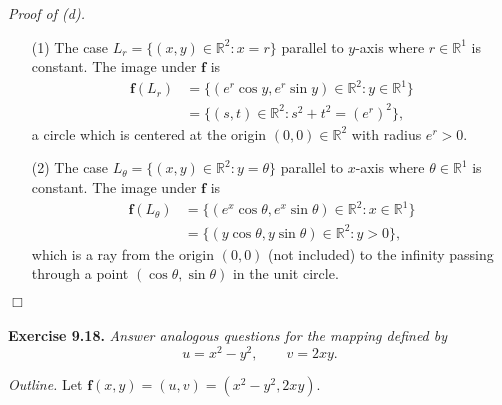 \documentclass{article}
\begin{document}
\emph{Proof of (d).}
\begin{enumerate}
\item[(1)]
  The case $L_r = \{ (x,y) \in \mathbb{R}^2 : x = r \}$ parallel to $y$-axis
  where $r \in \mathbb{R}^1$ is constant.
  The image under $\mathbf{f}$ is
  \begin{align*}
    \mathbf{f}(L_r)
    &= \{ (e^r \cos y, e^r \sin y) \in \mathbb{R}^2 : y \in \mathbb{R}^1 \} \\
    &= \{ (s, t) \in \mathbb{R}^2 : s^2 + t^2 = (e^r)^2 \},
  \end{align*}
  a circle which is centered at the origin $(0,0) \in \mathbb{R}^2$ with radius $e^{r} > 0$.

\item[(2)]
  The case $L_{\theta} = \{ (x,y) \in \mathbb{R}^2 : y = \theta \}$ parallel to $x$-axis
  where $\theta \in \mathbb{R}^1$ is constant.
  The image under $\mathbf{f}$ is
  \begin{align*}
    \mathbf{f}(L_{\theta})
    &= \{ (e^x \cos \theta, e^x \sin \theta) \in \mathbb{R}^2 : x \in \mathbb{R}^1 \} \\
    &= \{ (y \cos \theta, y \sin \theta) \in \mathbb{R}^2 : y > 0 \},
  \end{align*}
  which is a ray from the origin $(0,0)$ (not included) to the infinity
  passing through a point $(\cos\theta, \sin\theta)$ in the unit circle.
\end{enumerate}
$\Box$ \\\\






\textbf{Exercise 9.18.}
\emph{Answer analogous questions for the mapping defined by}
\[
  u = x^2-y^2, \qquad v = 2xy.
\]

\emph{Outline.}
Let $\mathbf{f}(x,y) = (u, v) = (x^2-y^2,2xy)$.
\end{document}
